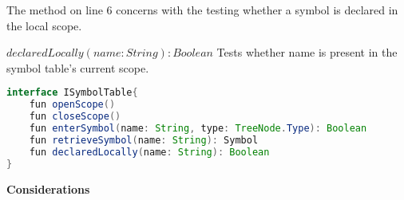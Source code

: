 The method on line 6 concerns with the testing whether a symbol is declared in the local scope.

$declaredLocally(name: String): Boolean$ Tests whether name is present in the symbol table's current scope.

\begin{lstlisting}[language=java,label=lis:STInterface,caption=The interface which all symbol table implementations must implement.]
interface ISymbolTable{
	fun openScope()
	fun closeScope()
	fun enterSymbol(name: String, type: TreeNode.Type): Boolean
	fun retrieveSymbol(name: String): Symbol
	fun declaredLocally(name: String): Boolean
}
\end{lstlisting}

\textbf{Considerations}\\
